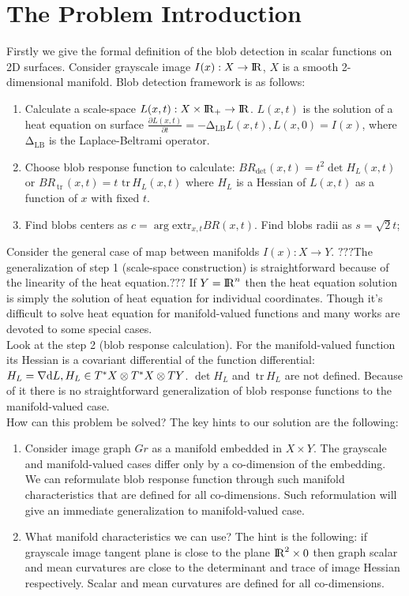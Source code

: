 \documentclass{llncs}
\newcommand{\LaplaceBeltrami}{\mathrm{\Delta_{{LB}}}}
\newcommand{\partderiv}[2]{\frac{\partial #1}{\partial #2}}
\newcommand{\extr}[1]{\mathrm{extr}_{#1}}
\newcommand{\toreal}{\rightarrow\bbbr}
\newcommand{\CovariantDiff}{\nabla}
\newcommand{\Diff}{\mathrm{d}}
\newcommand{\TangentBundle}[1]{T{#1}}
\newcommand{\CotangentBundle}[1]{\tensor*{T}{^{*}}{#1}}
\newcommand {\tr}{{\,}\mathrm{tr}{\,}}
\begin{document}
\section{The Problem Introduction}
Firstly we give the formal definition of the blob detection in scalar functions on 2D surfaces.
Consider grayscale image $I(x):X \toreal$, $X$ is a smooth 2-dimensional manifold. Blob detection framework is as follows:
\begin{enumerate} 
\item Calculate a scale-space $L(x,t):X\times \bbbr_{+} \toreal$. $L(x,t)$ is the solution of a heat equation  on surface
  $\partderiv{L(x, t)}{t}=-\LaplaceBeltrami{ L(x, t)},L(x, 0)=I(x)$, where $\LaplaceBeltrami$ is the Laplace-Beltrami operator.
\item Choose blob response function to calculate: $BR_{\det}(x, t)=t^2 \det{H_L(x,t)}$ or $BR_{\tr}(x, t)=t\, \tr {H_L(x,t)}$ where $H_L$ is a Hessian of $L(x, t)$ as a function of $x$ with fixed $t$.
\item Find blobs centers as $c=\arg \extr{x,t} BR(x, t)$. Find blobs radii as $s=\sqrt{2} t$;
\end{enumerate}

Consider the general case of map between manifolds $I(x):X \to Y$. $???$The generalization of step 1 (scale-space construction) is straightforward because of the linearity of the heat equation.$???$ If $Y={\rm I\!R}^n$ then the heat equation solution is simply the solution of heat equation for individual coordinates. Though it's difficult to solve heat equation for manifold-valued functions and many works are devoted to some special cases. 
\\
Look at the step 2 (blob response calculation). For the manifold-valued function its Hessian is a covariant differential of the function differential: $H_L=\CovariantDiff \Diff L,H_L \in \CotangentBundle{X}\otimes\CotangentBundle{X}\otimes\TangentBundle{Y}$. $\det H_L$ and $\tr{H_L}$ are not defined. Because of it there is no straightforward generalization of blob response functions to the manifold-valued case. 
\\
How can this problem be solved? The key hints to our solution are the following:
\begin{enumerate}
\item	Consider image graph $Gr$ as a manifold embedded in $X\times Y$. The grayscale and manifold-valued cases differ only by a co-dimension of the embedding. We can reformulate blob response function through such manifold characteristics that are defined for all co-dimensions. Such reformulation will give an immediate generalization to manifold-valued case. 
\item	What manifold characteristics we can use? The hint is the following: if grayscale image tangent plane is close to the plane ${\rm I\!R}^2\times 0$ then graph scalar and mean curvatures are close to the determinant and trace of image Hessian respectively. Scalar and mean curvatures are defined for all co-dimensions.
\end{enumerate}
\end{document}
